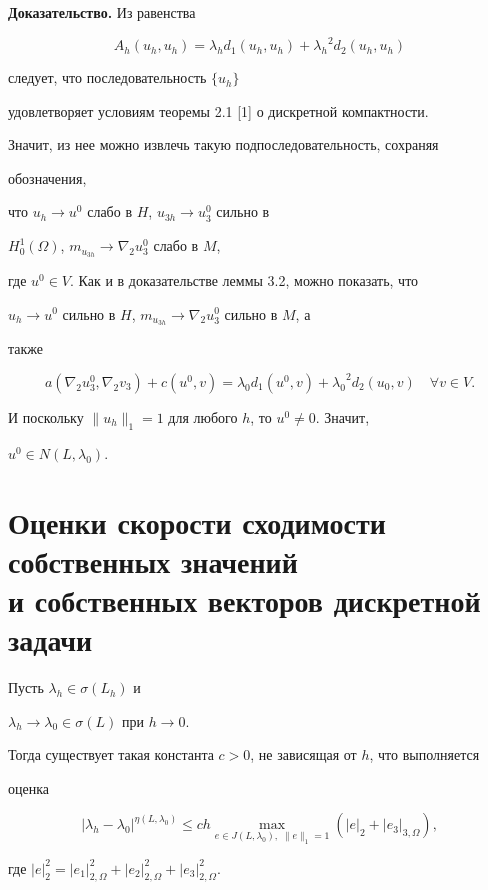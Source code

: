{\bf Доказательство.} Из равенства


$$


A_h(u_h,u_h)=\lambda_h d_1(u_h,u_h)+{\lambda_h}^2 d_2(u_h,u_h)


$$


следует, что последовательность $\{ u_h\}$


удовлетворяет условиям теоремы 2.1 [1] о дискретной компактности.


Значит, из нее можно извлечь такую подпоследовательность, сохраняя


обозначения,


что $u_h\to u^0$ слабо в $H$, $u_{3h}\to u_3^0$ сильно в


$H_0^1(\Omega)$, $m_{u_{3h}} \to \nabla_2 u_3^0$ слабо в $M$,


где $u^0\in V.$ Как и в доказательстве леммы 3.2, можно показать, что


$u_h\to u^0$ сильно в $H$, $m_{u_{3h}} \to \nabla_2 u_3^0$ сильно в $M$, а


также


$$


a(\nabla_2{u_3^0},\nabla_2{v_3})+c(u^0,v)=


\lambda_0 d_1(u^0,v)+{\lambda_0}^2{d}_2(u_0,v)\quad \forall v \in V.


$$


И поскольку $\|u_h\|_1=1$ для любого $h$, то $u^0\neq 0$. Значит,


$u^0\in N(L,\lambda_0).$





\section{Оценки скорости сходимости собственных значений\protect\\


и собственных векторов дискретной задачи}





\begin{thms} Пусть $\lambda_h \in \sigma(L_h)$ и


$\lambda_h \to \lambda_0\in \sigma(L)$ при $h \to 0$.


Тогда существует такая константа $c>0$, не зависящая от $h$, что выполняется


оценка


\begin{equation}


|\lambda_h-\lambda_0|^{\eta(L,\lambda_0)}\le


ch\max_{e\in J(L,\lambda_0),\;\|e\|_1=1}(|e|_2+|e_3|_{3,\Omega}),


\end{equation}


где $|e|_2^2=|e_1|_{2,\Omega}^2+|e_2|_{2,\Omega}^2+|e_3|_{2,\Omega}^2.$


\end{thms}





